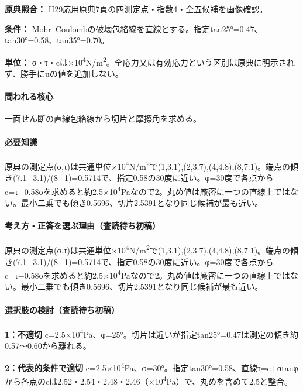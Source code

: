 \noindent\textbf{原典照合：} H29応用原典7頁の四測定点・指数4・全五候補を画像確認。\par

\noindent\textbf{条件：} Mohr–Coulombの破壊包絡線を直線とする。指定tan25°=0.47、tan30°=0.58、tan35°=0.70。\par

\noindent\textbf{単位：} σ・τ・cは×10\textsuperscript{4}N/m\textsuperscript{2}。全応力又は有効応力という区別は原典に明示されず、勝手にuの値を追加しない。\par

\paragraph{問われる核心} 一面せん断の直線包絡線から切片と摩擦角を求める。

\paragraph{必要知識} 原典の測定点(σ,τ)は共通単位×10\textsuperscript{4}N/m\textsuperscript{2}で(1,3.1),(2,3.7),(4,4.8),(8,7.1)。端点の傾き(7.1−3.1)/(8−1)=\allowbreak{}0.5714で、指定0.58の30度に近い。φ=30度で各点からc=τ−0.58σを求めると約2.5×10\textsuperscript{4}Paなので2。丸め値は厳密に一つの直線上ではない。最小二乗でも傾き0.5696、切片2.5391となり同じ候補が最も近い。

\paragraph{考え方・正答を選ぶ理由（査読待ち初稿）} 原典の測定点(σ,τ)は共通単位×10\textsuperscript{4}N/m\textsuperscript{2}で(1,3.1),(2,3.7),(4,4.8),(8,7.1)。端点の傾き(7.1−3.1)/(8−1)=\allowbreak{}0.5714で、指定0.58の30度に近い。φ=30度で各点からc=τ−0.58σを求めると約2.5×10\textsuperscript{4}Paなので2。丸め値は厳密に一つの直線上ではない。最小二乗でも傾き0.5696、切片2.5391となり同じ候補が最も近い。

\paragraph{選択肢の検討（査読待ち初稿）}\mbox{}\par

\noindent\textbf{1：不適切} c=\allowbreak{}2.5×10\textsuperscript{4}Pa、φ=25°。切片は近いが指定tan25°=0.47は測定の傾き約0.57〜0.60から離れる。\par

\noindent\textbf{2：代表的条件で適切} c=\allowbreak{}2.5×10\textsuperscript{4}Pa、φ=30°。指定tan30°=0.58、直線τ=c+σtanφから各点のcは2.52・2.54・2.48・2.46（×10\textsuperscript{4}Pa）で、丸めを含めて2.5と整合。\par

